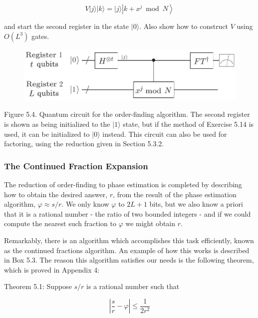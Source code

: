 \begin{equation}
    V|j\rangle|k\rangle=|j\rangle\left|k+x^{j} \bmod N\right\rangle \tag{5.47}
\end{equation}

and start the second register in the state $|0\rangle$. Also show how to construct $V$ using $O\left(L^{3}\right)$ gates.

\begin{figure}
\centering
\includegraphics[width=0.75\linewidth]{Images/2024_05_17_6977ce60de6fd27aef98g-263}
\end{figure}

Figure 5.4. Quantum circuit for the order-finding algorithm. The second register is shown as being initialized to the $|1\rangle$ state, but if the method of Exercise 5.14 is used, it can be initialized to $|0\rangle$ instead. This circuit can also be used for factoring, using the reduction given in Section 5.3.2.

\subsubsection{The Continued Fraction Expansion}

The reduction of order-finding to phase estimation is completed by describing how to obtain the desired answer, $r$, from the result of the phase estimation algorithm, $\varphi \approx s / r$. We only know $\varphi$ to $2 L+1$ bits, but we also know a priori that it is a rational number - the ratio of two bounded integers - and if we could compute the nearest such fraction to $\varphi$ we might obtain $r$.

Remarkably, there is an algorithm which accomplishes this task efficiently, known as the continued fractions algorithm. An example of how this works is described in Box 5.3. The reason this algorithm satisfies our needs is the following theorem, which is proved in Appendix 4:

Theorem 5.1: Suppose $s / r$ is a rational number such that

\begin{equation}
    \left|\frac{s}{r}-\varphi\right| \leq \frac{1}{2 r^{2}} \tag{5.48}
\end{equation}

